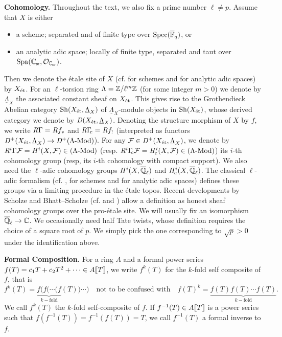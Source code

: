 \documentclass[../main.tex]{subfiles}
\begin{document}
\textbf{Cohomology.} 
Throughout the text, we also fix a prime number $\ell \neq p$.
Assume that $X$ is either 
\begin{itemize}
  \item a scheme; separated and of finite type over $\operatorname{Spec}({\overline {\mathbb{F}}_q})$, or
  \item an analytic adic space; locally of finite type, separated and taut over
    $\spa(\Cp, \cO_\Cp)$. 
\end{itemize}
Then we denote the \'etale site of $X$ (cf. \cite{LeiFuEtale} for schemes and
\cite{huber2013etale} for analytic adic spaces) by $X_{\textnormal{\'et}}$. For an
$\ell$-torsion ring $\Lambda = \mathbb{Z}/\ell^m \mathbb{Z}$ (for some integer $m>0$) we denote
by $\underline \Lambda_X$ the associated constant sheaf on $X_{\textnormal{\'et}}$. This gives
rise to the Grothendieck Abelian category $\mathrm{Sh}(X_{\textnormal{\'et}}, {\underline \Lambda_X})$ of
$\underline \Lambda_X$-module objects in $\mathrm{Sh}(X_{\textnormal{\'et}})$, whose derived category
we denote by $\mathit D(X_{\textnormal{\'et}}, \underline \Lambda_X)$. 
Denoting the structure morphism of $X$ by $f$, we write 
$\mathit R \Gamma = \mathit R f_*$ and $\mathit R \Gamma_{\hspace{-2pt}\mathrm{c}} = \mathit R f_!$ (interpreted as functors
$\mathit D^+(X_{\textnormal{\'et}}, \underline \Lambda_X) \to \mathit D^+{({\Lambda}\textnormal-\allowbreak\mathrm{Mod})}$).
For any $\mathcal{F} \in \mathit D^+(X_{\textnormal{\'et}}, \underline \Lambda_X)$, we denote 
by $\mathit R^i\Gamma\mathcal{F} = \mathit H^i(X, \mathcal{F}) \in {({\Lambda}\textnormal-\allowbreak\mathrm{Mod})}$ (resp. $\mathit R^i \Gamma_{\hspace{-2pt}\mathrm{c}} \mathcal{F} = 
\mathit H_{\mathrm{c}}^i(X, \mathcal{F}) \in {({\Lambda}\textnormal-\allowbreak\mathrm{Mod})}$) its $i$-th cohomology group (resp, its
$i$-th cohomology with compact support).
We also need the $\ell$-adic cohomology groups $\mathit H^i(X, {\overline {\mathbb{Q}}_\ell})$ 
and $\mathit H_{\mathrm{c}}^i(X, {\overline {\mathbb{Q}}_\ell})$. The classical $\ell$-adic formalism (cf. \cite{LeiFuEtale},
\cite{jannsen1988continuous} for schemes and \cite{huber1998comparison} for
analytic adic spaces) defines these groups via a limiting procedure in the 
\'etale topos. Recent developments by Scholze and Bhatt--Scholze (cf.
\cite{scholze2017etale} and \cite{bhattscholze2013pro}) allow a definition
as honest sheaf cohomology groups over the pro-\'etale site. 
We will usually fix an isomorphism ${\overline {\mathbb{Q}}_\ell} \to \mathbb{C}$. We occasionally need half Tate twists, whose definition requires the choice of a square root of $p$. We simply pick the one corresponding to $\sqrt p > 0$ under the identification above.

\textbf{Formal Composition.}
For a ring $A$ and a formal power series $f(T) = c_1 T + c_2 T^2 + \dots \in
A\llbracket T \rrbracket$, we write $f^k(T)$ for the $k$-fold self composite of $f$, that is
\begin{equation*}
  f^k(T) = \underbrace{f(f( \cdots (f}_{k-\text{fold}}(T)) \cdots) \quad \text{not to be confused with}
  \quad f(T)^k = \underbrace{f(T) f(T) \cdots f(T)}_{k-\text{fold}}.
\end{equation*}
We call $f^k(T)$ the $k$-fold self-composite of $f$. If $f^{-1}(T) \in A\llbracket T \rrbracket$
is a power series such that $f(f^{-1}(T)) = f^{-1}(f(T)) = T$, we call
$f^{-1}(T)$ a formal inverse to $f$.
\end{document}
